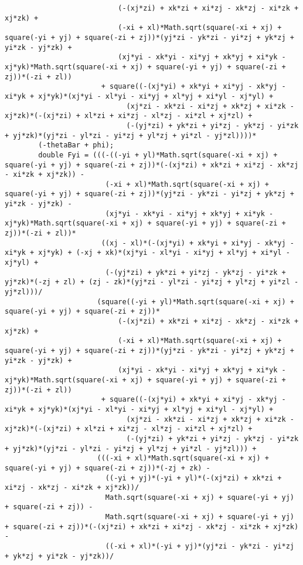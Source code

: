 \begin{lstlisting}
						   (-(xj*zi) + xk*zi + xi*zj - xk*zj - xi*zk + xj*zk) + 
						   (-xi + xl)*Math.sqrt(square(-xi + xj) + square(-yi + yj) + square(-zi + zj))*(yj*zi - yk*zi - yi*zj + yk*zj + yi*zk - yj*zk) + 
						   (xj*yi - xk*yi - xi*yj + xk*yj + xi*yk - xj*yk)*Math.sqrt(square(-xi + xj) + square(-yi + yj) + square(-zi + zj))*(-zi + zl))
					   + square((-(xj*yi) + xk*yi + xi*yj - xk*yj - xi*yk + xj*yk)*(xj*yi - xl*yi - xi*yj + xl*yj + xi*yl - xj*yl) + 
							 (xj*zi - xk*zi - xi*zj + xk*zj + xi*zk - xj*zk)*(-(xj*zi) + xl*zi + xi*zj - xl*zj - xi*zl + xj*zl) + 
							 (-(yj*zi) + yk*zi + yi*zj - yk*zj - yi*zk + yj*zk)*(yj*zi - yl*zi - yi*zj + yl*zj + yi*zl - yj*zl))))*
		(-thetaBar + phi);
		double Fyi = (((-((-yi + yl)*Math.sqrt(square(-xi + xj) + square(-yi + yj) + square(-zi + zj))*(-(xj*zi) + xk*zi + xi*zj - xk*zj - xi*zk + xj*zk)) - 
						(-xi + xl)*Math.sqrt(square(-xi + xj) + square(-yi + yj) + square(-zi + zj))*(yj*zi - yk*zi - yi*zj + yk*zj + yi*zk - yj*zk) - 
						(xj*yi - xk*yi - xi*yj + xk*yj + xi*yk - xj*yk)*Math.sqrt(square(-xi + xj) + square(-yi + yj) + square(-zi + zj))*(-zi + zl))*
					   ((xj - xl)*(-(xj*yi) + xk*yi + xi*yj - xk*yj - xi*yk + xj*yk) + (-xj + xk)*(xj*yi - xl*yi - xi*yj + xl*yj + xi*yl - xj*yl) + 
						(-(yj*zi) + yk*zi + yi*zj - yk*zj - yi*zk + yj*zk)*(-zj + zl) + (zj - zk)*(yj*zi - yl*zi - yi*zj + yl*zj + yi*zl - yj*zl)))/
					  (square((-yi + yl)*Math.sqrt(square(-xi + xj) + square(-yi + yj) + square(-zi + zj))*
						   (-(xj*zi) + xk*zi + xi*zj - xk*zj - xi*zk + xj*zk) + 
						   (-xi + xl)*Math.sqrt(square(-xi + xj) + square(-yi + yj) + square(-zi + zj))*(yj*zi - yk*zi - yi*zj + yk*zj + yi*zk - yj*zk) + 
						   (xj*yi - xk*yi - xi*yj + xk*yj + xi*yk - xj*yk)*Math.sqrt(square(-xi + xj) + square(-yi + yj) + square(-zi + zj))*(-zi + zl))
					   + square((-(xj*yi) + xk*yi + xi*yj - xk*yj - xi*yk + xj*yk)*(xj*yi - xl*yi - xi*yj + xl*yj + xi*yl - xj*yl) + 
							 (xj*zi - xk*zi - xi*zj + xk*zj + xi*zk - xj*zk)*(-(xj*zi) + xl*zi + xi*zj - xl*zj - xi*zl + xj*zl) + 
							 (-(yj*zi) + yk*zi + yi*zj - yk*zj - yi*zk + yj*zk)*(yj*zi - yl*zi - yi*zj + yl*zj + yi*zl - yj*zl))) + 
					  (((-xi + xl)*Math.sqrt(square(-xi + xj) + square(-yi + yj) + square(-zi + zj))*(-zj + zk) - 
						((-yi + yj)*(-yi + yl)*(-(xj*zi) + xk*zi + xi*zj - xk*zj - xi*zk + xj*zk))/
						Math.sqrt(square(-xi + xj) + square(-yi + yj) + square(-zi + zj)) - 
						Math.sqrt(square(-xi + xj) + square(-yi + yj) + square(-zi + zj))*(-(xj*zi) + xk*zi + xi*zj - xk*zj - xi*zk + xj*zk) - 
						((-xi + xl)*(-yi + yj)*(yj*zi - yk*zi - yi*zj + yk*zj + yi*zk - yj*zk))/

\end{lstlisting}
